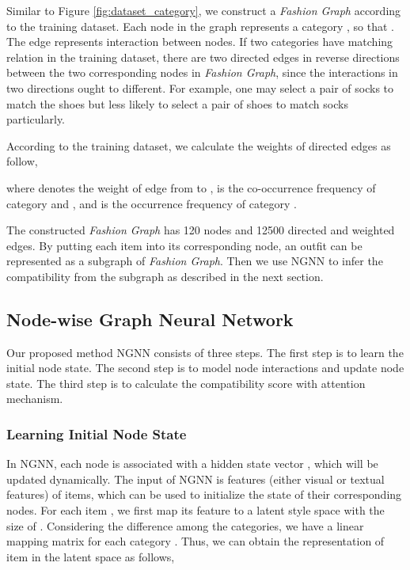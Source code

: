 \documentclass[sigconf]{acmart}
\begin{document}
Similar to Figure \ref{fig:dataset_category}, we construct a \emph{Fashion Graph}  according to the training dataset.
Each node in the graph  represents a category , so that . The edge represents interaction between nodes.
If two categories have matching relation in the training dataset, there are two directed edges in reverse directions between the two corresponding nodes in \emph{Fashion Graph}, since the interactions in two directions ought to different. For example, one may select a pair of socks to match the shoes but less likely to select a pair of shoes to match socks particularly.


According to the training dataset, we calculate the weights of directed edges as follow,

where  denotes the weight of edge from  to ,  is the co-occurrence frequency of category  and , and  is the occurrence frequency of category .

The constructed \emph{Fashion Graph} has 120 nodes and 12500 directed and weighted edges.
By putting each item into its corresponding node, an outfit can be represented as a subgraph of \emph{Fashion Graph}. Then we use NGNN to infer the compatibility from the subgraph as described in the next section.



\subsection{Node-wise Graph Neural Network}


Our proposed method NGNN consists of three steps. The first step is to learn the initial node state. The second step is to model node interactions and update node state. The third step is to calculate the compatibility score with attention mechanism.

\subsubsection{Learning Initial Node State}\label{sect:input}
In NGNN, each node  is associated with a hidden state vector , which will be updated dynamically.
The input of NGNN is features (either visual or textual features) of items, which can be used to initialize the state of their corresponding nodes.
For each item , we first map its feature  to a latent style space with the size of .
Considering the difference among the categories, we have a linear mapping matrix  for each category . Thus, we can obtain the representation of item  in the latent space as follows,
\end{document}

